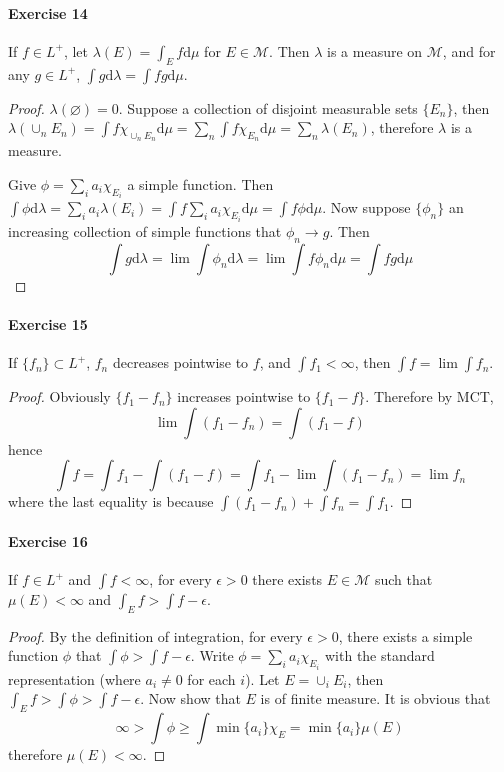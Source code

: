 \paragraph{Exercise 14}
If $f\in L^+$, let $\lambda(E)=\int_Ef\mathrm{d}\mu$ for $E\in\mathcal{M}$. Then $\lambda$ is a measure on $\mathcal{M}$, and for any $g\in L^+$, $\int g\mathrm{d}\lambda=\int fg\mathrm{d}\mu$.
\begin{proof}
    $\lambda(\varnothing)=0$. Suppose a collection of disjoint measurable sets $\{E_n\}$, then $\lambda(\cup_n E_n)=\int f\chi_{\cup_nE_n}\mathrm{d}\mu=\sum_n\int f\chi_{E_n}\mathrm{d}\mu=\sum_n\lambda(E_n)$, therefore $\lambda$ is a measure.
    \par Give $\phi=\sum_ia_i\chi_{E_i}$ a simple function. Then $\int\phi\mathrm{d}\lambda=\sum_ia_i\lambda(E_i)=\int f\sum_ia_i\chi_{E_i}\mathrm{d}\mu=\int f\phi\mathrm{d}\mu$. Now suppose $\{\phi_n\}$ an increasing collection of simple functions that $\phi_n\to g$. Then
    $$
    \int g\mathrm{d}\lambda=\lim\int\phi_n\mathrm{d}\lambda=\lim\int f\phi_n\mathrm{d}\mu=\int fg\mathrm{d}\mu
    $$
\end{proof}
\paragraph{Exercise 15}
If $\{f_n\}\subset L^+$, $f_n$ decreases pointwise to $f$, and $\int f_1<\infty$, then $\int f=\lim\int f_n$.
\begin{proof}
    Obviously $\{f_1-f_n\}$ increases pointwise to $\{f_1-f\}$. Therefore by MCT,
    $$
    \lim\int(f_1-f_n)=\int(f_1-f)
    $$
    hence
    $$
    \int f=\int f_1-\int (f_1-f)=\int f_1-\lim\int(f_1-f_n)=\lim f_n
    $$
    where the last equality is because $\int (f_1-f_n)+\int f_n=\int f_1$.
\end{proof}
\paragraph{Exercise 16}
If $f\in L^+$ and $\int f<\infty$, for every $\epsilon>0$ there exists $E\in\mathcal{M}$ such that $\mu(E)<\infty$ and $\int_E f>\int f-\epsilon$.
\begin{proof}
    By the definition of integration, for every $\epsilon>0$, there exists a simple function $\phi$ that $\int\phi>\int f-\epsilon$. Write $\phi=\sum_i a_i\chi_{E_i}$ with the standard representation (where $a_i\neq 0$ for each $i$). Let $E=\cup_iE_i$, then $\int_E f>\int\phi>\int f-\epsilon$. Now show that $E$ is of finite measure. It is obvious that
    $$
    \infty>\int\phi\ge\int\min\{a_i\}\chi_E=\min\{a_i\}\mu(E)
    $$
    therefore $\mu(E)<\infty$.
\end{proof}
